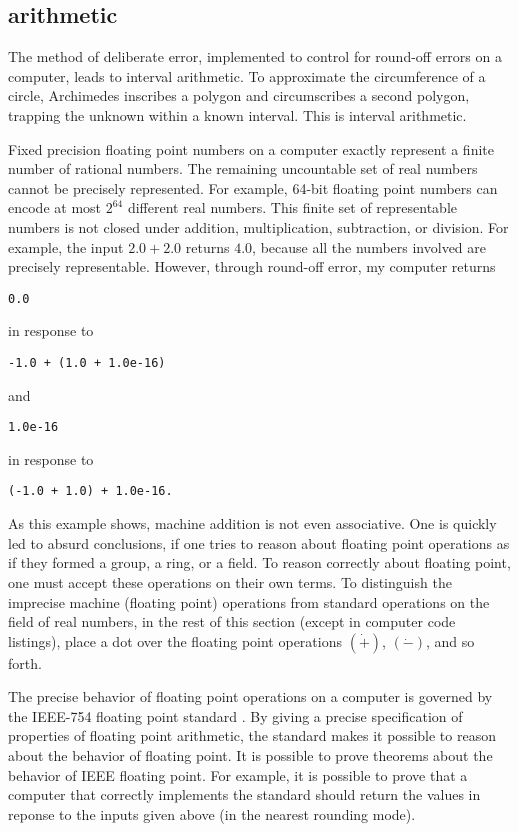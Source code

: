 \clearpage


\subsection{arithmetic}

The method of deliberate error, implemented to control for round-off
errors on a computer, leads to interval arithmetic.  To approximate
the circumference of a circle, Archimedes inscribes a polygon and
circumscribes a second polygon, trapping the unknown within a known
interval.  This is interval arithmetic.


Fixed precision floating point numbers on a computer exactly represent
a finite number of rational numbers.  The remaining uncountable set of
real numbers cannot be precisely represented.  For example, 64-bit
floating point numbers can encode at most $2^{64}$ different real
numbers.  This finite set of representable numbers is not closed under
addition, multiplication, subtraction, or division.  For example, the
input $2.0 + 2.0$ returns $4.0$, because all the numbers involved are
precisely representable.  However, through round-off error, my
computer returns
\begin{verbatim}0.0
\end{verbatim} 
in response to
\begin{verbatim}
-1.0 + (1.0 + 1.0e-16)
\end{verbatim}
and 
\begin{verbatim}1.0e-16
\end{verbatim} 
in response to 
\begin{verbatim}
(-1.0 + 1.0) + 1.0e-16.
\end{verbatim}
As this example shows, machine addition is not even associative.  One
is quickly led to absurd conclusions, if one tries to reason about
floating point operations as if they formed a group, a ring, or a
field.  To reason correctly about floating point, one must accept
these operations on their own terms.  To distinguish the imprecise
machine (floating point) operations from standard operations on the
field of real numbers, in the rest of this section (except in computer
code listings), place a dot over the floating point operations $(\dot
+)$, $(\dot -)$, and so forth.

The precise behavior of floating point operations on a computer is
governed by the IEEE-754 floating point standard \cite{Gol}.  By
giving a precise specification of properties of floating point
arithmetic, the standard makes it possible to reason about the
behavior of floating point.  It is possible to prove theorems about
the behavior of IEEE floating point.  For example, it is possible to
prove that a computer that correctly implements the standard should
return the values in reponse to the inputs given above (in the nearest
rounding mode).

